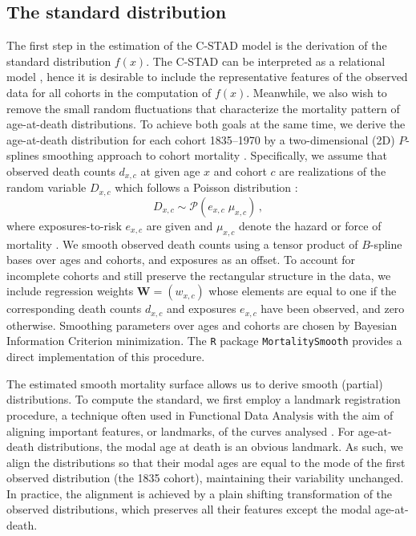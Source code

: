\documentclass[11pt, a4paper]{article}
\begin{document}
\subsection{The standard distribution}
\label{Subsec:Standard}
The first step in the estimation of the C-STAD model is the derivation of the standard distribution $f(x)$. The C-STAD can be interpreted as a relational model \citep{brass1971scale}, hence it is desirable to include the representative features of the observed data for all cohorts in the computation of $f(x)$. Meanwhile, we also wish to remove the small random fluctuations that characterize the mortality pattern of age-at-death distributions. To achieve both goals at the same time, we derive the age-at-death distribution for each cohort 1835--1970 by a two-dimensional (2D) $P$-splines smoothing approach to cohort mortality \citep{eilers1996flexible, currie2004smoothing}. Specifically, we assume that observed death counts $d_{x,c}$ at given age $x$ and cohort $c$ are realizations of the random variable $D_{x,c}$ which follows a Poisson distribution \citep{brillinger1986biometrics}:
%
\begin{equation}\label{Eq:Poisson}
D_{x,c} \sim \mathcal{P}(e_{x,c} \; \mu_{x,c}) \, ,
\end{equation}
%
where exposures-to-risk $e_{x,c}$ are given and $\mu_{x,c}$ denote the hazard or force of mortality \cite[such as in, for example,][]{brouhns2002poisson}. We smooth observed death counts using a tensor product of $B$-spline bases over ages and cohorts, and exposures as an offset. To account for incomplete cohorts and still preserve the rectangular structure in the data, we include regression weights $\bm{W} = (w_{x,c})$ whose elements are equal to one if the corresponding death counts $d_{x,c}$ and exposures $e_{x,c}$ have been observed, and zero otherwise. Smoothing parameters over ages and cohorts are chosen by Bayesian Information Criterion minimization. The \texttt{R} package \texttt{MortalitySmooth} \citep{camarda2012mortalitysmooth} provides a direct implementation of this procedure. 

The estimated smooth mortality surface allows us to derive smooth (partial) distributions. To compute the standard, we first employ a landmark registration procedure, a technique often used in Functional Data Analysis with the aim of aligning important features, or landmarks, of the curves analysed \citep{ramsay2005FDA}. For age-at-death distributions, the modal age at death is an obvious landmark. As such, we align the distributions so that their modal ages are equal to the mode of the first observed distribution (the 1835 cohort), maintaining their variability unchanged. In practice, the alignment is achieved by a plain shifting transformation of the observed distributions, which preserves all their features except the modal age-at-death. 
\end{document}
